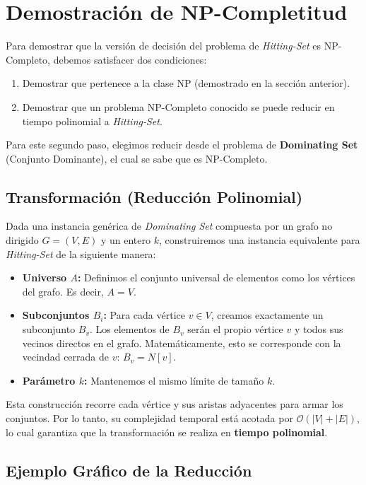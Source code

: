 \usepackage{tikz}
\section{Demostración de NP-Completitud}

Para demostrar que la versión de decisión del problema de \textit{Hitting-Set} es NP-Completo, debemos satisfacer dos condiciones:
\begin{enumerate}
    \item Demostrar que pertenece a la clase NP (demostrado en la sección anterior).
    \item Demostrar que un problema NP-Completo conocido se puede reducir en tiempo polinomial a \textit{Hitting-Set}.
\end{enumerate}

Para este segundo paso, elegimos reducir desde el problema de \textbf{Dominating Set} (Conjunto Dominante), el cual se sabe que es NP-Completo.

\subsection{Transformación (Reducción Polinomial)}

Dada una instancia genérica de \textit{Dominating Set} compuesta por un grafo no dirigido $G = (V, E)$ y un entero $k$, construiremos una instancia equivalente para \textit{Hitting-Set} de la siguiente manera:

\begin{itemize}
    \item \textbf{Universo $A$:} Definimos el conjunto universal de elementos como los vértices del grafo. Es decir, $A = V$.
    \item \textbf{Subconjuntos $B_i$:} Para cada vértice $v \in V$, creamos exactamente un subconjunto $B_v$. Los elementos de $B_v$ serán el propio vértice $v$ y todos sus vecinos directos en el grafo. Matemáticamente, esto se corresponde con la vecindad cerrada de $v$: $B_v = N[v]$.
    \item \textbf{Parámetro $k$:} Mantenemos el mismo límite de tamaño $k$.
\end{itemize}

Esta construcción recorre cada vértice y sus aristas adyacentes para armar los conjuntos. Por lo tanto, su complejidad temporal está acotada por $\mathcal{O}(|V| + |E|)$, lo cual garantiza que la transformación se realiza en \textbf{tiempo polinomial}.

\subsection{Ejemplo Gráfico de la Reducción}


